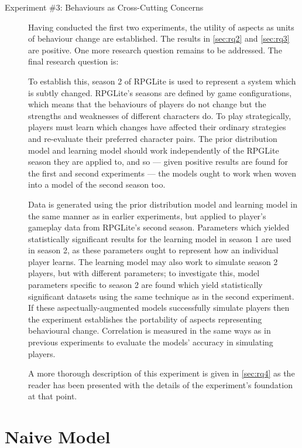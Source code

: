 \begin{description}
\item[Experiment \#3: Behaviours as Cross-Cutting Concerns] Having conducted the
first two experiments, the utility of aspects as units of behaviour change are
established. The results in \cref{sec:rq2} and \cref{sec:rq3} are positive. One
more research question remains to be addressed. The final research question is:
\emph{\rqthree{}}

To establish this, season 2 of RPGLite is used to represent a system
which is subtly changed. RPGLite's seasons are defined by game configurations,
which means that the behaviours of players do not change but the strengths and
weaknesses of different characters do. To play strategically, players must learn
which changes have affected their ordinary strategies and re-evaluate their
preferred character pairs. The prior distribution model and learning model
should work independently of the RPGLite season they are applied to, and so ---
given positive results are found for the first and second experiments --- the
models ought to work when woven into a model of the second season
too.

Data is generated using the prior distribution model and learning model in the
same manner as in earlier experiments, but applied to player's gameplay data
from RPGLite's second season. Parameters which yielded statistically significant
results for the learning model in season 1 are used in season 2, as these
parameters ought to represent how an individual player learns. The learning
model may also work to simulate season 2 players, but with different parameters;
to investigate this, model parameters specific to season 2 are found which yield
statistically significant datasets using the same technique as in the second
experiment. If these aspectually-augmented models successfully simulate players
then the experiment establishes the portability of aspects representing
behavioural change. Correlation is measured in the same ways as in previous
experiments to evaluate the models' accuracy in simulating players.

A more thorough description of this experiment is given in \cref{sec:rq4} as the
reader has been presented with the details of the experiment's foundation at
that point.


\end{description}



\section{Naive Model}\label{sec:optimisation_with_aspects_naivemodel}
\label{sec:naive_model}

